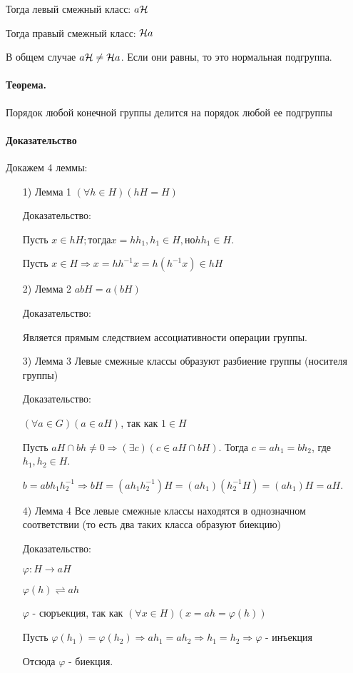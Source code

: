 \documentclass{report}
\begin{document}
Тогда левый смежный класс: $a\cal H$

Тогда правый смежный класс: ${\cal H}a$

В общем случае $a{\cal H} \neq {\cal H}a$. Если они равны, то это нормальная подгруппа.

\paragraph*{Теорема.}
Порядок любой конечной группы делится на порядок любой ее подгруппы
\paragraph*{Доказательство}
Докажем 4 леммы:
\begin{itemize}
	\item[1)] Лемма 1\newline
		$(\forall h \in H)(hH = H)$

		Доказательство:

		Пусть $x \in hH; тогда x = hh_1, h_1 \in H, но hh_1 \in H$.

		Пусть $x \in H \Rightarrow x = hh^{-1}x = h(h^{-1}x) \in hH$
	\item[2)] Лемма 2\newline
		$abH = a(bH)$

		Доказательство:

		Является прямым следствием ассоциативности операции группы.
	\item[3)] Лемма 3\newline
		Левые смежные классы образуют разбиение группы (носителя группы)

		Доказательство:

		$(\forall a \in G)(a \in aH)$, так как $1 \in H$

		Пусть $aH \cap bh \neq 0 \Rightarrow (\exists c)(c \in aH \cap bH)$. Тогда
		$c = ah_1 = bh_2$, где $h_1,h_2 \in H$.

		$b = abh_1h^{-1}_2 \Rightarrow bH = (ah_1 h^{-1}_2)H = (ah_1)(h^{-1}_2 H) = (ah_1)H = aH$.
	\item[4)] Лемма 4\newline
		Все левые смежные классы находятся в однозначном соответствии (то есть два таких класса образуют биекцию)

		Доказательство:

		$\varphi: H \to aH$

		$\varphi(h) \rightleftharpoons ah$

		$\varphi$ - сюръекция, так как $(\forall x \in H)(x = ah = \varphi(h))$

		Пусть $\varphi(h_1) = \varphi(h_2) \Rightarrow ah_1 = ah_2 \Rightarrow h_1 = h_2 \Rightarrow \varphi$ - инъекция

		Отсюда $\varphi$ - биекция.
\end{itemize}
\end{document}
